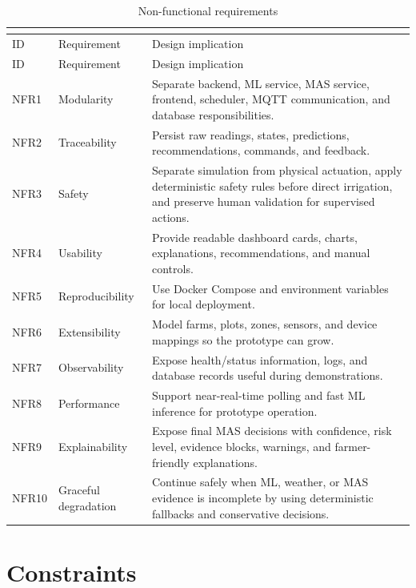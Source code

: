 \begin{footnotesize}
\setlength{\tabcolsep}{2pt}
\begin{longtable}{@{}p{}p{}p{}@{}}
\caption{Non-functional requirements}\\
\label{tab:non_functional_requirements}\\
\toprule
ID & Requirement & Design implication \\
\midrule
\endfirsthead
\toprule
ID & Requirement & Design implication \\
\midrule
\endhead
NFR1 & Modularity & Separate backend, ML service, MAS service, frontend, scheduler, MQTT communication, and database responsibilities. \\
NFR2 & Traceability & Persist raw readings, states, predictions, recommendations, commands, and feedback. \\
NFR3 & Safety & Separate simulation from physical actuation, apply deterministic safety rules before direct irrigation, and preserve human validation for supervised actions. \\
NFR4 & Usability & Provide readable dashboard cards, charts, explanations, recommendations, and manual controls. \\
NFR5 & Reproducibility & Use Docker Compose and environment variables for local deployment. \\
NFR6 & Extensibility & Model farms, plots, zones, sensors, and device mappings so the prototype can grow. \\
NFR7 & Observability & Expose health/status information, logs, and database records useful during demonstrations. \\
NFR8 & Performance & Support near-real-time polling and fast ML inference for prototype operation. \\
NFR9 & Explainability & Expose final MAS decisions with confidence, risk level, evidence blocks, warnings, and farmer-friendly explanations. \\
NFR10 & Graceful degradation & Continue safely when ML, weather, or MAS evidence is incomplete by using deterministic fallbacks and conservative decisions. \\
\bottomrule
\end{longtable}
\end{footnotesize}

\section{Constraints}

